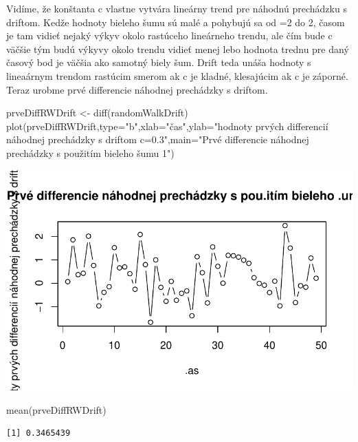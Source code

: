 \documentclass[
  letterpaper,
  DIV=11,
  numbers=noendperiod]{scrreprt}
\newenvironment{Shaded}{\begin{snugshade}}{\end{snugshade}}
\newcommand{\AttributeTok}[1]{\textcolor[rgb]{0.40,0.45,0.13}{#1}}
\newcommand{\FunctionTok}[1]{\textcolor[rgb]{0.28,0.35,0.67}{#1}}
\newcommand{\NormalTok}[1]{\textcolor[rgb]{0.00,0.23,0.31}{#1}}
\newcommand{\OtherTok}[1]{\textcolor[rgb]{0.00,0.23,0.31}{#1}}
\newcommand{\StringTok}[1]{\textcolor[rgb]{0.13,0.47,0.30}{#1}}
\begin{document}
Vidíme, že konštanta c vlastne vytvára lineárny trend pre náhodnú
prechádzku s driftom. Kedže hodnoty bieleho šumu sú malé a pohybujú sa
od =2 do 2, časom je tam vidieť nejaký výkyv okolo rastúceho lineárneho
trendu, ale čím bude c väčšie tým budú výkyvy okolo trendu vidieť menej
lebo hodnota trednu pre daný časový bod je väčšia ako samotný biely šum.
Drift teda unáša hodnoty s lineaárnym trendom rastúcim smerom ak c je
kladné, klesajúcim ak c je záporné. Teraz urobme prvé differencie
náhodnej prechádzky s driftom.

\begin{Shaded}
\begin{Highlighting}[]
\NormalTok{prveDiffRWDrift }\OtherTok{\textless{}{-}} \FunctionTok{diff}\NormalTok{(randomWalkDrift)}
\FunctionTok{plot}\NormalTok{(prveDiffRWDrift,}\AttributeTok{type=}\StringTok{"b"}\NormalTok{,}\AttributeTok{xlab=}\StringTok{"čas"}\NormalTok{,}\AttributeTok{ylab=}\StringTok{"hodnoty prvých differencií náhodnej prechádzky s driftom c=0.3"}\NormalTok{,}\AttributeTok{main=}\StringTok{"Prvé differencie náhodnej prechádzky s použitím bieleho šumu 1"}\NormalTok{)}
\end{Highlighting}
\end{Shaded}

\includegraphics{prednaska3_NahodnaPrechadzkaStacionarita_files/figure-pdf/unnamed-chunk-9-1.pdf}

\begin{Shaded}
\begin{Highlighting}[]
\FunctionTok{mean}\NormalTok{(prveDiffRWDrift)}
\end{Highlighting}
\end{Shaded}

\begin{verbatim}
[1] 0.3465439
\end{verbatim}
\end{document}
